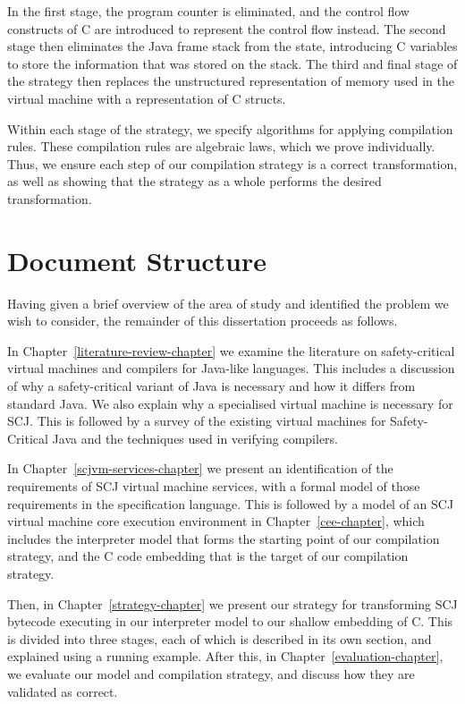 In the first stage, the program counter is eliminated, and the control
flow constructs of C are introduced to represent the control flow
instead.
The second stage then eliminates the Java frame stack from the state,
introducing C variables to store the information that was stored on
the stack.
The third and final stage of the strategy then replaces the
unstructured representation of memory used in the virtual machine with
a representation of C structs.

Within each stage of the strategy, we specify algorithms for applying
compilation rules.
These compilation rules are algebraic laws, which we prove
individually.
Thus, we ensure each step of our compilation strategy is a correct
transformation, as well as showing that the strategy as a whole
performs the desired transformation.

\section{Document Structure}

Having given a brief overview of the area of study and identified the
problem we wish to consider, the remainder of this dissertation
proceeds as follows.

In Chapter~\ref{literature-review-chapter} we examine the literature
on safety-critical virtual machines and compilers for Java-like
languages.
This includes a discussion of why a safety-critical variant of Java is
necessary and how it differs from standard Java.
We also explain why a specialised virtual machine is necessary for
SCJ.
This is followed by a survey of the existing virtual machines for
Safety-Critical Java and the techniques used in verifying compilers.

In Chapter~\ref{scjvm-services-chapter} we present an identification
of the requirements of SCJ virtual machine services, with a formal
model of those requirements in the \Circus{} specification language.
This is followed by a model of an SCJ virtual machine
core execution environment in Chapter~\ref{cee-chapter}, which
includes the interpreter model that forms the starting point of our
compilation strategy, and the C code embedding that is the target of
our compilation strategy.

Then, in Chapter~\ref{strategy-chapter}\added{,} we present our
strategy for transforming SCJ bytecode executing in our interpreter
model to our shallow embedding of C.
This is divided into three stages, each of which is described in its
own section, and explained using a running example.
After this, in Chapter~\ref{evaluation-chapter}, we evaluate our model
and compilation strategy, and discuss how they are validated as
correct.


